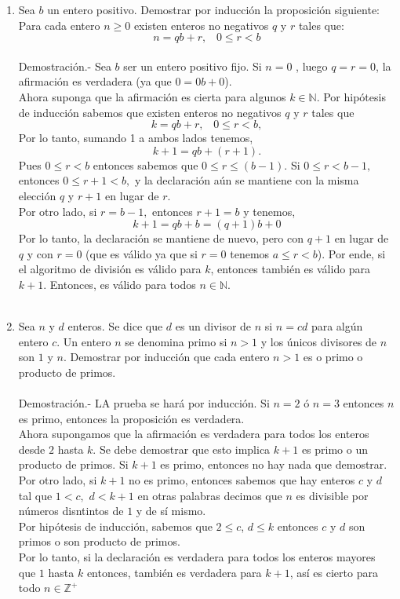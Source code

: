 \begin{enumerate}[\bfseries  1.]
\item Sea $b$ un entero positivo. Demostrar por inducción la proposición siguiente: Para cada entero $n\geq 0$ existen enteros no negativos $q$ \; y \; $r$ tales que:
$$n=qb+r, \; \; \; 0\leq r < b$$ \\
Demostración.- \; Sea $b$ ser un entero positivo fijo. Si $n=0$ , luego $q=r=0$, la afirmación es verdadera (ya que $0=0b+0$).\\
Ahora suponga que la afirmación es cierta para algunos $k \in \mathbb{N}$. Por hipótesis de inducción sabemos que existen enteros no negativos $q$ \; y \; $r$ tales que $$k=qb+r, \; \; \; 0\leq r < b,$$ Por lo tanto, sumando 1 a ambos lados tenemos, $$k+1=qb+(r+1).$$ Pues $0\leq r < b$ entonces sabemos que $0\leq r \leq (b-1)$. Si $0\leq r < b-1,$ entonces $0\leq r+1<b,$ y la declaración aún se mantiene con la misma elección $q$ \; y \; $r+1$ en lugar de $r$.\\
Por otro lado, si $r=b-1,$ entonces $r+1=b$ y tenemos, $$k+1=qb+b=(q+1)b+0$$
Por lo tanto, la declaración se mantiene de nuevo, pero con $q+1$ en lugar de $q$ \; y con $r=0$ (que es válido ya que si $r=0$ tenemos $a\leq r < b$). Por ende, si el algoritmo de división es válido para $k$, entonces también es válido para $k+1.$ Entonces, es válido para todos $n \in \mathbb{N}$.\\\\

\item Sea $n$ \; y \; $d$ enteros. Se dice que $d$ es un divisor de $n$ si $n=cd$ para algún entero $c$. Un entero $n$ se denomina primo si $n>1$ y los únicos divisores de $n$ son $1$ \; y \; $n$. Demostrar por inducción que cada entero $n>1$ es o primo o producto de primos.\\\\
Demostración.- \; LA prueba se hará por inducción. Si $n=2$ ó $n=3$ entonces $n$ es primo, entonces la proposición es verdadera.\\
Ahora supongamos que la afirmación es verdadera para todos los enteros desde $2$ hasta $k$. Se debe demostrar que esto implica $k+1$ es primo o un producto de primos. Si $k+1$ es primo, entonces no hay nada que demostrar. Por otro lado, si $k+1$ no es primo, entonces sabemos que hay enteros $c$ \; y \; $d$ tal que $1<c,$ $d<k+1$ en otras palabras decimos que $n$ es divisible por números disntintos de $1$ y de sí mismo.\\
Por hipótesis de inducción, sabemos que $2\leq c$, $d\leq k$ entonces $c$ \; y \; $d$ son primos o son producto de primos.\\
Por lo tanto, si la declaración es verdadera para todos los enteros mayores que $1$ hasta $k$ entonces, también es verdadera para $k+1$, así es cierto para todo $n\in \mathbb{Z}^+$\\\\


\end{enumerate}
